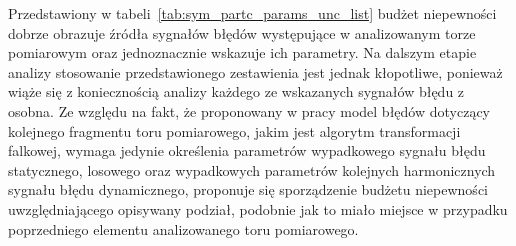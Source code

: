 Przedstawiony w tabeli~\ref{tab:sym_partc_params_unc_list} budżet niepewności dobrze obrazuje źródła sygnałów błędów występujące w analizowanym torze pomiarowym oraz jednoznacznie wskazuje ich parametry. Na dalszym etapie analizy stosowanie przedstawionego zestawienia jest jednak kłopotliwe, ponieważ wiąże się z koniecznością analizy każdego ze wskazanych sygnałów błędu z osobna. Ze względu na fakt, że proponowany w pracy model błędów dotyczący kolejnego fragmentu toru pomiarowego, jakim jest algorytm transformacji falkowej, wymaga jedynie określenia parametrów wypadkowego sygnału błędu statycznego, losowego oraz wypadkowych parametrów kolejnych harmonicznych sygnału błędu dynamicznego, proponuje się sporządzenie budżetu niepewności uwzględniającego opisywany podział, podobnie jak to miało miejsce w przypadku poprzedniego elementu analizowanego toru pomiarowego.

